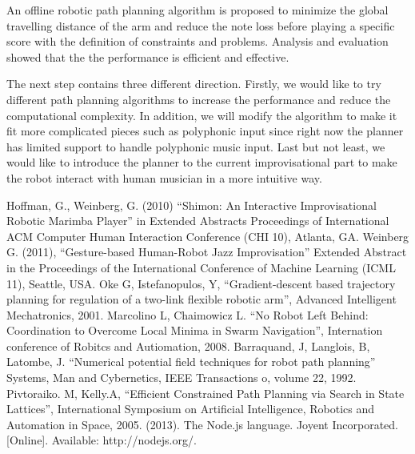 \documentclass[letterpaper, 10 pt, conference]{ieeeconf}  %
\begin{document}
An offline robotic path planning algorithm is proposed to minimize the global travelling distance of the arm and reduce the note loss before playing a specific score with the definition of constraints and problems.  Analysis and evaluation showed that the the performance is efficient and effective.

The next step contains three different direction. Firstly, we would like to try different path planning algorithms to increase the performance and reduce the computational complexity. In addition, we will modify the algorithm to make it fit more complicated pieces such as polyphonic input since right now the planner has limited support to handle polyphonic music input. Last but not least, we would like to introduce the planner to the current improvisational part to make the robot interact with human musician in a more intuitive way.

\addtolength{\textheight}{-12cm}   %








\begin{thebibliography}{99}
 Hoffman, G., Weinberg, G. (2010) ``Shimon: An Interactive Improvisational Robotic Marimba Player'' in Extended Abstracts Proceedings of International ACM Computer Human Interaction Conference (CHI 10), Atlanta, GA.
 Weinberg G. (2011), ``Gesture-based Human-Robot Jazz Improvisation'' Extended Abstract in the Proceedings of the International Conference of Machine Learning (ICML 11), Seattle, USA.
 Oke G, Istefanopulos, Y,  ``Gradient-descent based trajectory planning for regulation of a two-link flexible robotic arm'', Advanced Intelligent Mechatronics, 2001.
 Marcolino L, Chaimowicz L. ``No Robot Left Behind: Coordination to Overcome Local Minima in Swarm Navigation'', Internation conference of Robitcs and Autiomation, 2008.
 Barraquand, J, Langlois, B, Latombe, J. ``Numerical potential field techniques for robot path planning'' Systems, Man and Cybernetics, IEEE Transactions o, volume 22, 1992.
 Pivtoraiko. M, Kelly.A, ``Efficient Constrained Path Planning via Search in State Lattices'', International Symposium on Artificial Intelligence, Robotics and Automation in Space, 2005.
 (2013). The Node.js language. Joyent Incorporated. [Online]. Available: http://nodejs.org/.

\end{thebibliography}
\end{document}
